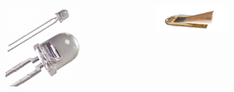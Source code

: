 \begin{frame}
\begin{columns}[c]
\begin{figure}[H]
\begin{center}
            \end{center}
            \end{figure}
            \begin{figure}[H]
            \begin{center}
                    \includegraphics[scale=0.1]{./img/misc/photodiode.jpg}
            \end{center}
            \end{figure}
            \begin{figure}[H]
            \begin{center}
                    \includegraphics[scale=0.1]{./img/misc/kraftsensor.jpg}
            \end{center}
            \end{figure}
    \end{columns}
\end{frame}
